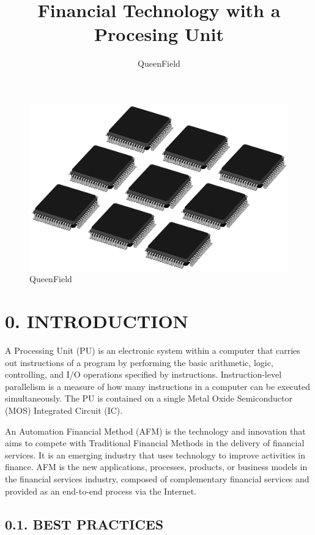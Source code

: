 \documentclass[
]{article}
\title{Financial Technology with a Procesing Unit}
\author{QueenField}
\date{}
\begin{document}
\maketitle

\begin{figure}
\centering
\includegraphics{../icon.jpg}
\caption{QueenField}
\end{figure}

\hypertarget{introduction}{%
\section{0. INTRODUCTION}\label{introduction}}

A Processing Unit (PU) is an electronic system within a computer that
carries out instructions of a program by performing the basic
arithmetic, logic, controlling, and I/O operations specified by
instructions. Instruction-level parallelism is a measure of how many
instructions in a computer can be executed simultaneously. The PU is
contained on a single Metal Oxide Semiconductor (MOS) Integrated Circuit
(IC).

An Automation Financial Method (AFM) is the technology and innovation
that aims to compete with Traditional Financial Methods in the delivery
of financial services. It is an emerging industry that uses technology
to improve activities in finance. AFM is the new applications,
processes, products, or business models in the financial services
industry, composed of complementary financial services and provided as
an end-to-end process via the Internet.

\hypertarget{best-practices}{%
\subsection{0.1. BEST PRACTICES}\label{best-practices}}
\end{document}
